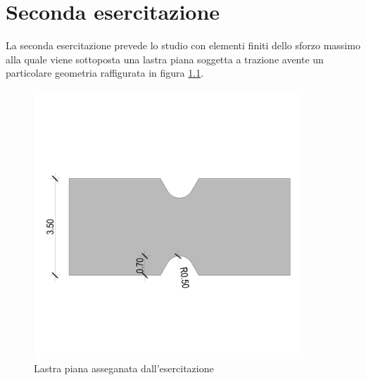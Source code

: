 \chapter{Seconda esercitazione}
La seconda esercitazione prevede lo studio con elementi finiti dello sforzo massimo alla quale viene sottoposta una lastra piana soggetta a trazione avente un particolare geometria raffigurata in figura \ref{fig:lastraIniziale}.
\begin{figure}[htb]
    \centering
    \includegraphics[width=0.9\textwidth]{rel2/img2/2Lastra.pdf}
    \caption{Lastra piana asseganata dall'esercitazione}
    \label{fig:lastraIniziale}
\end{figure}

